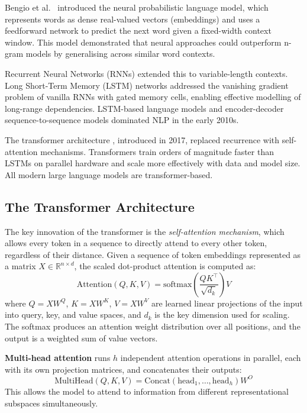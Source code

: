 Bengio et al.\ \cite{bengio2003neural} introduced the neural probabilistic language
model, which represents words as dense real-valued vectors (embeddings) and uses
a feedforward network to predict the next word given a fixed-width context window.
This model demonstrated that neural approaches could outperform n-gram models by
generalising across similar word contexts.

Recurrent Neural Networks (RNNs) extended this to variable-length contexts.
Long Short-Term Memory (LSTM) networks \cite{hochreiter1997long} addressed the
vanishing gradient problem of vanilla RNNs with gated memory cells, enabling
effective modelling of long-range dependencies.
LSTM-based language models and encoder-decoder sequence-to-sequence models
dominated NLP in the early 2010s.

The transformer architecture \cite{vaswani2017attention}, introduced in 2017,
replaced recurrence with self-attention mechanisms.
Transformers train orders of magnitude faster than LSTMs on parallel hardware
and scale more effectively with data and model size.
All modern large language models are transformer-based.

\subsection{The Transformer Architecture}
\label{subsec:transformer}

The key innovation of the transformer is the \emph{self-attention mechanism},
which allows every token in a sequence to directly attend to every other token,
regardless of their distance.
Given a sequence of token embeddings represented as a matrix $X \in \mathbb{R}^{n \times d}$,
the scaled dot-product attention is computed as:
\begin{equation}\label{eq:attention}
  \mathrm{Attention}(Q,K,V) = \mathrm{softmax}\!\left(\frac{QK^\top}{\sqrt{d_k}}\right) V
\end{equation}
where $Q = XW^Q$, $K = XW^K$, $V = XW^V$ are learned linear projections of the
input into query, key, and value spaces, and $d_k$ is the key dimension used for
scaling.
The softmax produces an attention weight distribution over all positions, and the
output is a weighted sum of value vectors.

\textbf{Multi-head attention} runs $h$ independent attention operations in parallel,
each with its own projection matrices, and concatenates their outputs:
\begin{equation}\label{eq:multihead}
  \mathrm{MultiHead}(Q,K,V) = \mathrm{Concat}(\mathrm{head}_1, \ldots, \mathrm{head}_h) W^O
\end{equation}
This allows the model to attend to information from different representational
subspaces simultaneously.

